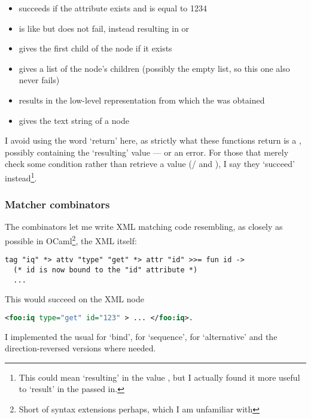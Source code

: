\documentclass[12pt,a4paper,twoside,openright]{report}
\begin{document}
{\begin{itemize}
  \item {} succeeds if the  attribute exists and is equal to 1234

  \item {} is like  but does not fail, instead resulting in  or 

  \item {} gives the first child of the node if it exists

  \item {} gives a list of the node's children (possibly the empty list, so this one also never fails)

  \item {} results in the low-level  representation from which the  was obtained

  \item {} gives the text string of a  node
\end{itemize}

I avoid using the word `return' here, as strictly what these functions return is a , possibly containing the `resulting' value --- or an error. For those that merely check some condition rather than retrieve a value (/ and ), I say they `succeed' instead\footnote{This could mean `resulting' in the value \code{()}, but I actually found it more useful to `result' in the  passed in.}.

\subsubsection{Matcher combinators}
The combinators let me write XML matching code resembling, as closely as possible in OCaml\footnote{Short of syntax extensions perhaps, which I am unfamiliar with}, the XML itself:

\begin{lstlisting}
tag "iq" *> attv "type" "get" *> attr "id" >>= fun id ->
  (* id is now bound to the "id" attribute *)
  ...
\end{lstlisting}

This would succeed on the XML node
\begin{lstlisting}[language=xml]
<foo:iq type="get" id="123" > ... </foo:iq>.
\end{lstlisting}

I implemented the usual \code{>>=} for `bind', \code{*>} for `sequence', \code{<|>} for `alternative' and the direction-reversed versions where needed.

}
\end{document}
